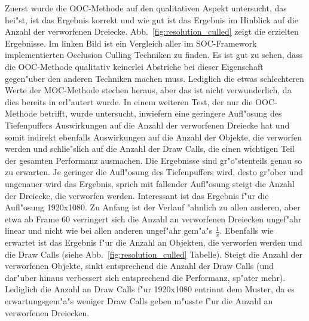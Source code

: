 \documentclass[journal]{vgtc}
\begin{document}
Zuerst wurde die OOC-Methode auf den qualitativen Aspekt untersucht, das hei"st, ist das Ergebnis korrekt und wie \glqq gut\grqq{} ist das Ergebnis im Hinblick auf die Anzahl der verworfenen Dreiecke.
Abb.\ \ref{fig:resolution_culled} zeigt die erzielten Ergebnisse.
Im linken Bild ist ein Vergleich aller im SOC-Framework implementierten Occlusion Culling Techniken zu finden.
Es ist gut zu sehen, dass die OOC-Methode qualitativ keinerlei Abstriche bei dieser Eigenschaft gegen"uber den anderen Techniken machen muss.
Lediglich die etwas schlechteren Werte der MOC-Methode stechen heraus, aber das ist nicht verwunderlich, da dies bereits in \cite{MSOC} erl"autert wurde.
In einem weiteren Test, der nur die OOC-Methode betrifft, wurde untersucht, inwiefern eine geringere Aufl"osung des Tiefenpuffers Auswirkungen auf die Anzahl der verworfenen Dreiecke hat und somit indirekt ebenfalls Auswirkungen auf die Anzahl der Objekte, die verworfen werden und schlie"slich auf die Anzahl der Draw Calls, die einen wichtigen Teil der gesamten Performanz ausmachen.
Die Ergebnisse sind gr"o"stenteils genau so zu erwarten.
Je geringer die Aufl"osung des Tiefenpuffers wird, desto gr"ober und ungenauer wird das Ergebnis, sprich mit fallender Aufl"osung steigt die Anzahl der Dreiecke, die verworfen werden.
Interessant ist das Ergebnis f"ur die Aufl"osung 1920x1080.
Zu Anfang ist der Verlauf "ahnlich zu allen anderen, aber etwa ab Frame 60 verringert sich die Anzahl an verworfenen Dreiecken ungef"ahr linear und nicht wie bei allen anderen ungef"ahr gem"a"s $\frac{1}{x}$.
Ebenfalls wie erwartet ist das Ergebnis f"ur die Anzahl an Objekten, die verworfen werden und die Draw Calls (siehe Abb.\ \ref{fig:resolution_culled} Tabelle).
Steigt die Anzahl der verworfenen Objekte, sinkt entsprechend die Anzahl der Draw Calls (und dar"uber hinaus verbessert sich entsprechend die Performanz, sp"ater mehr).
Lediglich die Anzahl an Draw Calls f"ur 1920x1080 entrinnt dem Muster, da es erwartungsgem"a"s weniger Draw Calls geben m"usste f"ur die Anzahl an verworfenen Dreiecken.\\
\end{document}
